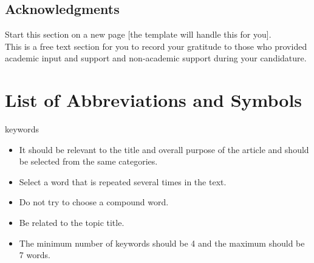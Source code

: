 


\section*{Acknowledgments}

\begin{instructional}
    Start this section on a new page [the template will handle this for you].\\
    
    \noindent
    This is a free text section for you to record your gratitude to those who provided academic input and support and non-academic support during your candidature.
\end{instructional}


\newpage
\null
\newpage
\tableofcontents*
	\clearpage
\listoffigures
	\clearpage
\listoftables


%

\chapter[List of Abbreviations and Symbols]{List of Abbreviations and Symbols}

keywords
\begin{itemize}
	 
	\item It should be relevant to the title and overall purpose of the article and should be selected from the same categories.
	\item Select a word that is repeated several times in the text.
	\item Do not try to choose a compound word.
	\item Be related to the topic title.
	\item The minimum number of keywords should be 4 and the maximum should be 7 words.
\end{itemize}

